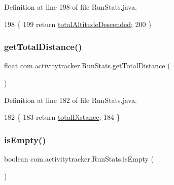 Definition at line 198 of file Run\+Stats.\+java.


\begin{DoxyCode}
198                                              \{
199         \textcolor{keywordflow}{return} \mbox{\hyperlink{classcom_1_1activitytracker_1_1_run_stats_ae511b3772f61773885d0178b215786d7}{totalAltitudeDescended}};
200     \}
\end{DoxyCode}
\mbox{\label{classcom_1_1activitytracker_1_1_run_stats_abdaa7bc971293da224da08e6a6b3bd4c}} 
\subsubsection{\texorpdfstring{get\+Total\+Distance()}{getTotalDistance()}}
{\footnotesize\ttfamily float com.\+activitytracker.\+Run\+Stats.\+get\+Total\+Distance (\begin{DoxyParamCaption}{ }\end{DoxyParamCaption})}



Definition at line 182 of file Run\+Stats.\+java.


\begin{DoxyCode}
182                                     \{
183         \textcolor{keywordflow}{return} \mbox{\hyperlink{classcom_1_1activitytracker_1_1_run_stats_a2e9486ea214a828e9f58489fd2b1a718}{totalDistance}};
184     \}
\end{DoxyCode}
\mbox{\label{classcom_1_1activitytracker_1_1_run_stats_a91d1d4302548cc114a1f1b63a47fcc1d}} 
\subsubsection{\texorpdfstring{is\+Empty()}{isEmpty()}}
{\footnotesize\ttfamily boolean com.\+activitytracker.\+Run\+Stats.\+is\+Empty (\begin{DoxyParamCaption}{ }\end{DoxyParamCaption})}

